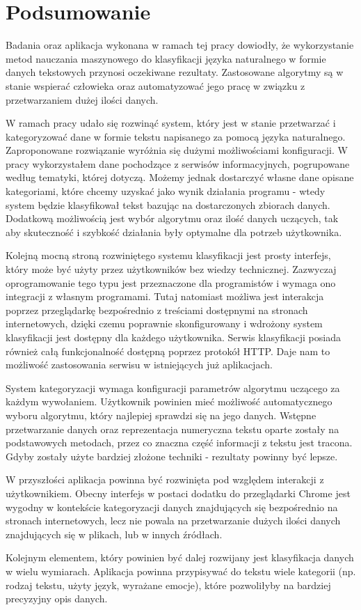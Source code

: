 \chapter{Podsumowanie}
\label{cha:podsumowanie}

Badania oraz aplikacja wykonana w ramach tej pracy dowiodły, że wykorzystanie metod nauczania maszynowego do klasyfikacji języka naturalnego w formie danych tekstowych przynosi oczekiwane rezultaty. Zastosowane algorytmy są w stanie wspierać człowieka oraz automatyzować jego pracę w związku z przetwarzaniem dużej ilości danych.


W ramach pracy udało się rozwinąć system, który jest w stanie przetwarzać i kategoryzować dane w formie tekstu napisanego za pomocą języka naturalnego. Zaproponowane rozwiązanie wyróżnia się dużymi możliwościami konfiguracji. W pracy wykorzystałem dane pochodzące z serwisów informacyjnych, pogrupowane według tematyki, której dotyczą. Możemy jednak dostarczyć własne dane opisane kategoriami, które chcemy uzyskać jako wynik działania programu - wtedy system będzie klasyfikował tekst bazując na dostarczonych zbiorach danych. Dodatkową możliwością jest wybór algorytmu oraz ilość danych uczących, tak aby skuteczność i szybkość działania były optymalne dla potrzeb użytkownika.

Kolejną mocną stroną rozwiniętego systemu klasyfikacji jest prosty interfejs, który może być użyty przez użytkowników bez wiedzy technicznej. Zazwyczaj oprogramowanie tego typu jest przeznaczone dla programistów i wymaga ono integracji z własnym programami. Tutaj natomiast możliwa jest interakcja poprzez przeglądarkę bezpośrednio z treściami dostępnymi na stronach internetowych, dzięki czemu poprawnie skonfigurowany i wdrożony system klasyfikacji jest dostępny dla każdego użytkownika. Serwis klasyfikacji posiada również całą funkcjonalność dostępną poprzez protokół HTTP. Daje nam to możliwość zastosowania serwisu w istniejących już aplikacjach.

System kategoryzacji wymaga konfiguracji parametrów algorytmu uczącego za każdym wywołaniem. Użytkownik powinien mieć możliwość automatycznego wyboru algorytmu, który najlepiej sprawdzi się na jego danych. Wstępne przetwarzanie danych oraz reprezentacja numeryczna tekstu oparte zostały na podstawowych metodach, przez co znaczna część informacji z tekstu jest tracona. Gdyby zostały użyte bardziej złożone techniki - rezultaty powinny być lepsze.

W przyszłości aplikacja powinna być rozwinięta pod względem interakcji z użytkownikiem. Obecny interfejs w postaci dodatku do przeglądarki Chrome jest wygodny w kontekście kategoryzacji danych znajdujących się bezpośrednio na stronach internetowych, lecz nie powala na przetwarzanie dużych ilości danych znajdujących się w plikach, lub w innych źródłach.

Kolejnym elementem, który powinien być dalej rozwijany jest klasyfikacja danych w wielu wymiarach. Aplikacja powinna przypisywać do tekstu wiele kategorii (np. rodzaj tekstu, użyty język, wyrażane emocje), które pozwoliłyby na bardziej precyzyjny opis danych.